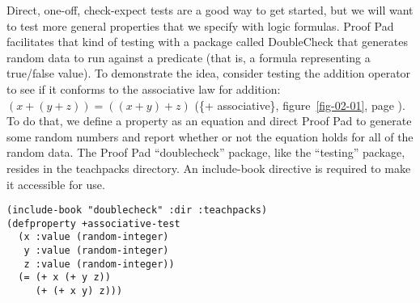 Direct, one-off, \textsf{check-expect} tests
are a good way to get started, but
we will want to test more general properties that we specify with logic formulas.
Proof Pad facilitates that kind of testing
with a package called
DoubleCheck
that generates
random data
to run against a predicate
(that is, a formula representing a true/false value).
To demonstrate the idea, consider testing the addition operator to see if
it conforms to the associative law for addition: $(x + (y + z)) = ((x + y) + z)$
(\{+ associative\}, figure~\ref{fig-02-01}, page \pageref{fig-02-01}).
To do that, we define a property as an equation
and direct Proof Pad to generate some random numbers and
report whether or not the equation holds for all of the random data.
The Proof Pad ``doublecheck'' package,
like the ``testing'' package,
resides in the
teachpacks directory.
An \textsf{include-book} directive is required to make it accessible for use.

\label{dblchk-include}
\begin{code}
\begin{verbatim}
(include-book "doublecheck" :dir :teachpacks)
(defproperty +associative-test
  (x :value (random-integer)
   y :value (random-integer)
   z :value (random-integer))
  (= (+ x (+ y z))
     (+ (+ x y) z)))
\end{verbatim}
\end{code}

